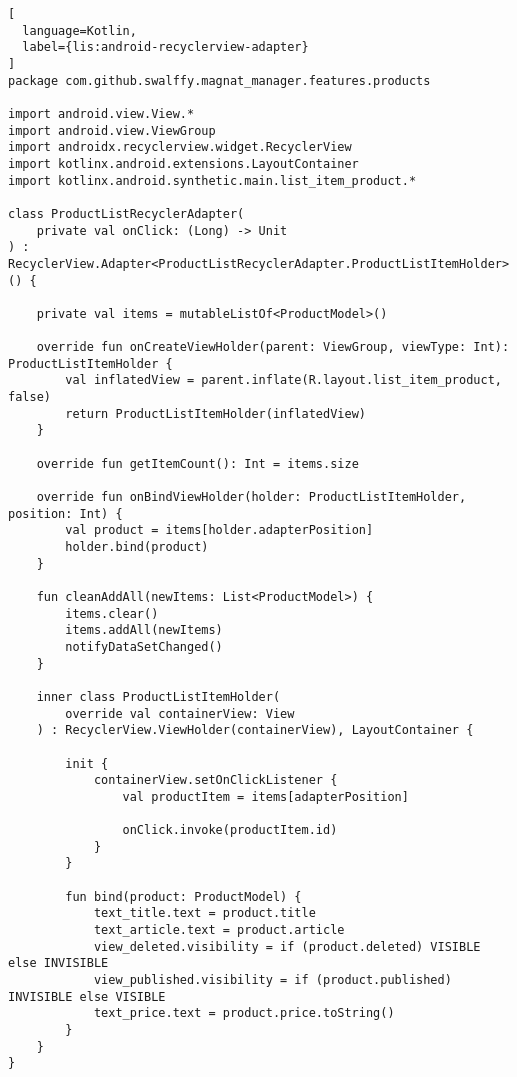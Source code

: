 \begin{lstlisting}[
  language=Kotlin,
  label={lis:android-recyclerview-adapter}
]
package com.github.swalffy.magnat_manager.features.products

import android.view.View.*
import android.view.ViewGroup
import androidx.recyclerview.widget.RecyclerView
import kotlinx.android.extensions.LayoutContainer
import kotlinx.android.synthetic.main.list_item_product.*

class ProductListRecyclerAdapter(
    private val onClick: (Long) -> Unit
) : RecyclerView.Adapter<ProductListRecyclerAdapter.ProductListItemHolder>() {

    private val items = mutableListOf<ProductModel>()

    override fun onCreateViewHolder(parent: ViewGroup, viewType: Int): ProductListItemHolder {
        val inflatedView = parent.inflate(R.layout.list_item_product, false)
        return ProductListItemHolder(inflatedView)
    }

    override fun getItemCount(): Int = items.size

    override fun onBindViewHolder(holder: ProductListItemHolder, position: Int) {
        val product = items[holder.adapterPosition]
        holder.bind(product)
    }

    fun cleanAddAll(newItems: List<ProductModel>) {
        items.clear()
        items.addAll(newItems)
        notifyDataSetChanged()
    }

    inner class ProductListItemHolder(
        override val containerView: View
    ) : RecyclerView.ViewHolder(containerView), LayoutContainer {

        init {
            containerView.setOnClickListener {
                val productItem = items[adapterPosition]

                onClick.invoke(productItem.id)
            }
        }

        fun bind(product: ProductModel) {
            text_title.text = product.title
            text_article.text = product.article
            view_deleted.visibility = if (product.deleted) VISIBLE else INVISIBLE
            view_published.visibility = if (product.published) INVISIBLE else VISIBLE
            text_price.text = product.price.toString()
        }
    }
}
\end{lstlisting}